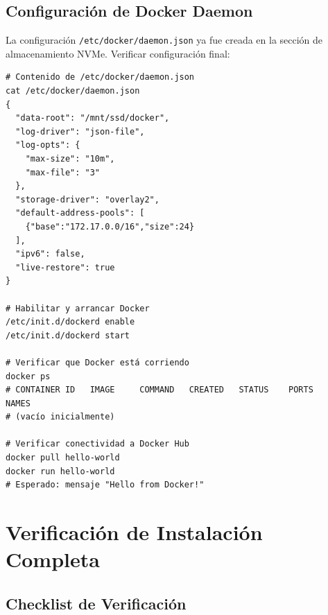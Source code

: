 \subsection{Configuración de Docker Daemon}

La configuración \texttt{/etc/docker/daemon.json} ya fue creada en la sección de almacenamiento NVMe. Verificar configuración final:

\begin{verbatim}
# Contenido de /etc/docker/daemon.json
cat /etc/docker/daemon.json
{
  "data-root": "/mnt/ssd/docker",
  "log-driver": "json-file",
  "log-opts": {
    "max-size": "10m",
    "max-file": "3"
  },
  "storage-driver": "overlay2",
  "default-address-pools": [
    {"base":"172.17.0.0/16","size":24}
  ],
  "ipv6": false,
  "live-restore": true
}

# Habilitar y arrancar Docker
/etc/init.d/dockerd enable
/etc/init.d/dockerd start

# Verificar que Docker está corriendo
docker ps
# CONTAINER ID   IMAGE     COMMAND   CREATED   STATUS    PORTS     NAMES
# (vacío inicialmente)

# Verificar conectividad a Docker Hub
docker pull hello-world
docker run hello-world
# Esperado: mensaje "Hello from Docker!"
\end{verbatim}

\section{Verificación de Instalación Completa}

\subsection{Checklist de Verificación}

